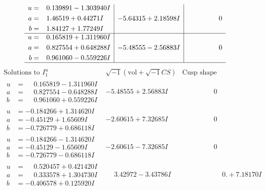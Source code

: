 \documentclass[1p]{elsarticle_modified}
\theoremstyle{definition}
\newcommand{\I}{\sqrt{-1}}
\begin{document}
$$\begin{array}{c|c|c}
\begin{aligned}
u &= \phantom{-}0.139891 - 1.303940 I \\
a &= \phantom{-}1.46519 + 0.44271 I \\
b &= \phantom{-}1.84127 + 1.77249 I\end{aligned}
 & -5.64315 + 2.18598 I & \phantom{-0.000000 } 0 \\ \hline\begin{aligned}
u &= \phantom{-}0.165819 + 1.311960 I \\
a &= \phantom{-}0.827554 + 0.648288 I \\
b &= \phantom{-}0.961060 - 0.559226 I\end{aligned}
 & -5.48555 - 2.56883 I & \phantom{-0.000000 } 0\\
 \hline 
 \end{array}$$\newpage$$\begin{array}{c|c|c}  
\text{Solutions to }I^u_{1}& \I (\text{vol} + \sqrt{-1}CS) & \text{Cusp shape}\\
 \hline 
\begin{aligned}
u &= \phantom{-}0.165819 - 1.311960 I \\
a &= \phantom{-}0.827554 - 0.648288 I \\
b &= \phantom{-}0.961060 + 0.559226 I\end{aligned}
 & -5.48555 + 2.56883 I & \phantom{-0.000000 } 0 \\ \hline\begin{aligned}
u &= -0.184266 + 1.314620 I \\
a &= -0.45129 + 1.65609 I \\
b &= -0.726779 + 0.686118 I\end{aligned}
 & -2.60615 + 7.32685 I & \phantom{-0.000000 } 0 \\ \hline\begin{aligned}
u &= -0.184266 - 1.314620 I \\
a &= -0.45129 - 1.65609 I \\
b &= -0.726779 - 0.686118 I\end{aligned}
 & -2.60615 - 7.32685 I & \phantom{-0.000000 } 0 \\ \hline\begin{aligned}
u &= \phantom{-}0.520457 + 0.421420 I \\
a &= \phantom{-}0.333578 + 1.304730 I \\
b &= -0.406578 + 0.125920 I\end{aligned}
 & \phantom{-}3.42972 - 3.43786 I & \phantom{-0.000000 -}0. + 7.18170 I \\ \hline\begin{aligned}

\end{aligned}
\end{array}$$
\end{document}
